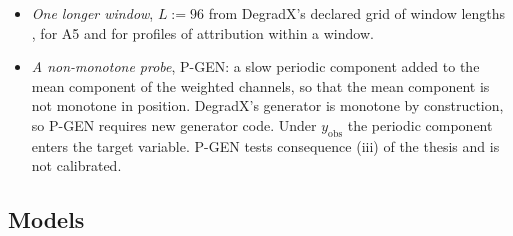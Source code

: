 \documentclass{article}
\begin{document}
\begin{itemize}
\item \emph{One longer window}, $L:=96$ from DegradX's declared grid of window lengths \citep{degradxrepo}, for A5 and for profiles of attribution within a window.
\item \emph{A non-monotone probe}, P-GEN: a slow periodic component added to the mean component of the weighted channels, so that the mean component is not monotone in position. DegradX's generator is monotone by construction, so P-GEN requires new generator code. Under $y_{\mathrm{obs}}$ the periodic component enters the target variable. P-GEN tests consequence (iii) of the thesis and is not calibrated.
\end{itemize}

\subsection{Models}\label{sec:eval:models}
\end{document}

